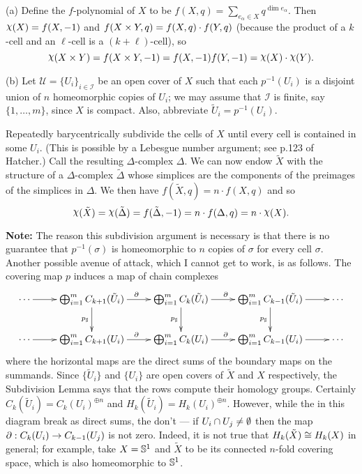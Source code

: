 \soln
(a) Define the $f$-polynomial of $X$ to be $f(X,q)=\sum_{e_\alpha\in X} q^{\dim e_\alpha}$.  Then
$\rchi(X)=f(X,-1)$ and $f(X\times Y,q)=f(X,q)\cdot f(Y,q)$ (because the product of a $k$-cell and an $\ell$-cell is a
$(k+\ell)$-cell), so
\[\rchi(X\x Y)=f(X\x Y,-1)=f(X,-1)f(Y,-1)=\rchi(X)\cdot\rchi(Y).\]

(b) Let $\mathcal{U}=\{U_i\}_{i\in\mathscr{I}}$ be an open cover of $X$ such that each $p^{-1}(U_i)$ is a disjoint union of $n$ homeomorphic copies of $U_i$; we may assume that $\mathscr{I}$ is finite, say $\{1,\dots,m\}$, since $X$ is compact.  Also, abbreviate $\tilde U_i=p^{-1}(U_i)$.

Repeatedly barycentrically subdivide the cells of $X$ until every cell is contained in some $U_i$.  (This is possible by a Lebesgue number argument; see p.123 of Hatcher.)  Call the resulting $\Delta$-complex $\Delta$.  We can now endow $\tilde X$ with the structure of a $\Delta$-complex $\tilde\Delta$ whose simplices are the components of the preimages of the simplices in $\Delta$.  We then have $f(\tilde X,q)=n\cdot f(X,q)$ and so
\[\rchi(\tilde X)=\rchi(\tilde\Delta)=f(\tilde\Delta,-1)=n\cdot f(\Delta,q)=n\cdot\rchi(X).\]

{\bf Note:}
The reason this subdivision argument is necessary is that there is no guarantee that $p^{-1}(\sigma)$ is homeomorphic to $n$ copies of $\sigma$ for every cell $\sigma$.  Another possible avenue of attack, which I cannot get to work, is as follows.  The covering map $p$ induces a map of chain complexes
\[
\xymatrix{
\cdots\rto&
\bigoplus_{i=1}^m C_{k+1}(\tilde U_i) \rto^\bd \dto_{p_\sharp}&
\bigoplus_{i=1}^m C_{k}(\tilde U_i) \rto^\bd \dto_{p_\sharp}&
\bigoplus_{i=1}^m C_{k-1}(\tilde U_i) \dto_{p_\sharp}\rto&\cdots\\
\cdots\rto&
\bigoplus_{i=1}^m C_{k+1}(U_i) \rto^\bd &
\bigoplus_{i=1}^m C_{k}(U_i) \rto^\bd &
\bigoplus_{i=1}^m C_{k-1}(U_i)\rto&\cdots\\
}\]
where the horizontal maps are the direct sums of the boundary maps on the summands.  Since $\{\tilde U_i\}$ and $\{U_i\}$ are open covers of $\tilde X$ and $X$ respectively, the Subdivision Lemma says that
the rows compute their homology groups.  Certainly $C_k(\tilde U_i)=C_k(U_i)^{\oplus n}$ and
$H_k(\tilde U_i)=H_k(U_i)^{\oplus n}$.  However, while the  in this diagram break as direct sums, the  don't --- if $U_i\cap U_j\neq\emptyset$ then the map $\partial:C_k(U_i)\to C_{k-1}(U_j)$ is not zero.  Indeed, it is not true that $H_k(\tilde X)\cong H_k(X)$ in general; for example, take $X=\mathbb{S}^1$ and $\tilde X$ to be its connected $n$-fold covering space, which is also homeomorphic to $\mathbb{S}^1$.


